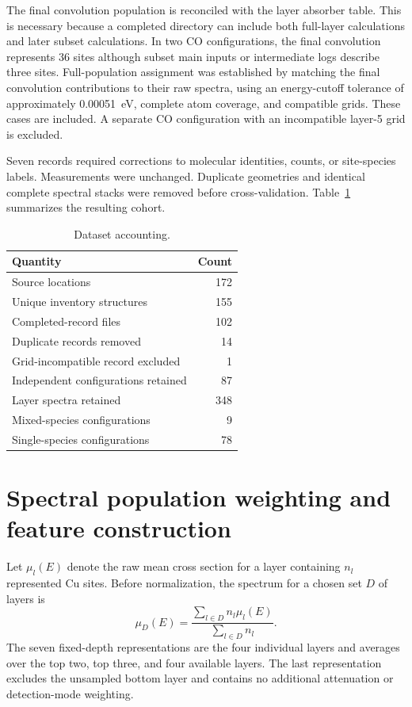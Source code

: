 \documentclass[11pt,a4paper]{article}
\begin{document}
The final convolution population is reconciled with the layer absorber table. This is necessary because a completed directory can include both full-layer calculations and later subset calculations. In two CO configurations, the final convolution represents 36 sites although subset main inputs or intermediate logs describe three sites. Full-population assignment was established by matching the final convolution contributions to their raw spectra, using an energy-cutoff tolerance of approximately 0.00051~eV, complete atom coverage, and compatible grids. These cases are included. A separate CO configuration with an incompatible layer-5 grid is excluded.

Seven records required corrections to molecular identities, counts, or site-species labels. Measurements were unchanged. Duplicate geometries and identical complete spectral stacks were removed before cross-validation. Table~\ref{tab:cohort} summarizes the resulting cohort.

\begin{table}[htbp]\centering
\caption{Dataset accounting.}\label{tab:cohort}
\begin{tabular}{@{}lr@{}}\toprule
Quantity & Count\\\midrule
Source locations &172\\
Unique inventory structures &155\\
Completed-record files &102\\
Duplicate records removed &14\\
Grid-incompatible record excluded &1\\
Independent configurations retained &87\\
Layer spectra retained &348\\
Mixed-species configurations &9\\
Single-species configurations &78\\\bottomrule
\end{tabular}
\end{table}

\section{Spectral population weighting and feature construction}
Let $\mu_l(E)$ denote the raw mean cross section for a layer containing $n_l$ represented Cu sites. Before normalization, the spectrum for a chosen set $D$ of layers is
\begin{equation}
\mu_D(E)=\frac{\sum_{l\in D}n_l\mu_l(E)}{\sum_{l\in D}n_l}.
\end{equation}
The seven fixed-depth representations are the four individual layers and averages over the top two, top three, and four available layers. The last representation excludes the unsampled bottom layer and contains no additional attenuation or detection-mode weighting.
\end{document}
